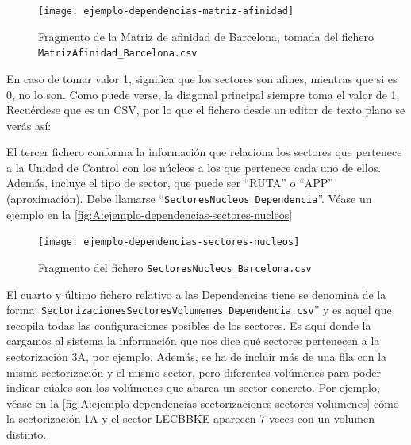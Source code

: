 \begin{figure}[h]
	\centering
	\texttt{[image: ejemplo-dependencias-matriz-afinidad]}
	\caption{Fragmento de la Matriz de afinidad de Barcelona, tomada del fichero \texttt{MatrizAfinidad\_Barcelona.csv}}
	\label{fig:A:ejemplo-dependencias-matriz-afinidad}
\end{figure}

En caso de tomar valor 1, significa que los sectores son afines, mientras que si es 0, no lo son. Como puede verse, la diagonal principal siempre toma el valor de 1. Recuérdese que es un CSV, por lo que el fichero desde un editor de texto plano se verás así:

\noindent{}

El tercer fichero conforma la información que relaciona los sectores que pertenece a la Unidad de Control con los núcleos a los que pertenece cada uno de ellos. Además, incluye el tipo de sector, que puede ser ``RUTA'' o ``APP'' (aproximación). Debe llamarse ``\texttt{SectoresNucleos\_Dependencia}''. Véase un ejemplo en la \autoref{fig:A:ejemplo-dependencias-sectores-nucleos}

\begin{figure}[h]
	\centering
	\texttt{[image: ejemplo-dependencias-sectores-nucleos]}
	\caption{Fragmento del fichero \texttt{SectoresNucleos\_Barcelona.csv}}
	\label{fig:A:ejemplo-dependencias-sectores-nucleos}
\end{figure}

El cuarto y último fichero relativo a las Dependencias tiene se denomina de la forma: \texttt{SectorizacionesSectoresVolumenes\_Dependencia.csv}'' y es aquel que recopila todas las configuraciones posibles de los sectores. Es aquí donde la cargamos al sistema la información que nos dice qué sectores pertenecen a la sectorización 3A, por ejemplo. Además, se ha de incluir más de una fila con la misma sectorización y el mismo sector, pero diferentes volúmenes para poder indicar cúales son los volúmenes que abarca un sector concreto. Por ejemplo, véase en la \autoref{fig:A:ejemplo-dependencias-sectorizaciones-sectores-volumenes} cómo la sectorización 1A y el sector LECBBKE aparecen 7 veces con un volumen distinto.

